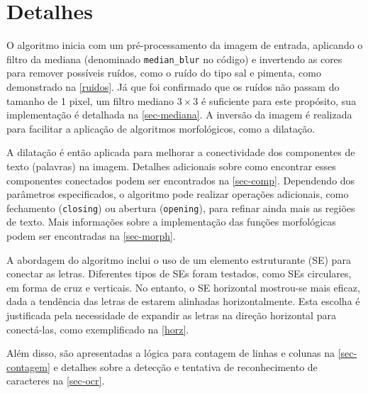 \documentclass[english, 
               brazil, 
               bsc] %
               {dcomp-abntex2}
\begin{document}






\section{Detalhes} 




O algoritmo inicia com um pré-processamento da imagem de entrada, aplicando o filtro da mediana (denominado \texttt{median\_blur} no código) e invertendo as cores para remover possíveis ruídos, como o ruído do tipo sal e pimenta, como demonstrado na \autoref{ruidos}. Já que foi confirmado que os ruídos não passam do tamanho de 1 pixel, um filtro mediano $3 \times 3$ é suficiente para este propósito, sua implementação é detalhada na \autoref{sec-mediana}. A inversão da imagem é realizada para facilitar a aplicação de algoritmos morfológicos, como a dilatação.


A dilatação é então aplicada para melhorar a conectividade dos componentes de texto (palavras) na imagem. Detalhes adicionais sobre como encontrar esses componentes conectados podem ser encontrados na \autoref{sec-comp}. Dependendo dos parâmetros especificados, o algoritmo pode realizar operações adicionais, como fechamento (\texttt{closing}) ou abertura (\texttt{opening}), para refinar ainda mais as regiões de texto. Mais informações sobre a implementação das funções morfológicas podem ser encontradas na \autoref{sec-morph}.


A abordagem do algoritmo inclui o uso de um elemento estruturante (SE) para conectar as letras. Diferentes tipos de SEs foram testados, como SEs circulares, em forma de cruz e verticais. No entanto, o SE horizontal mostrou-se mais eficaz, dada a tendência das letras de estarem alinhadas horizontalmente. Esta escolha é justificada pela necessidade de expandir as letras na direção horizontal para conectá-las, como exemplificado na \autoref{horz}.


Além disso, são apresentadas a lógica para contagem de linhas e colunas na \autoref{sec-contagem} e detalhes sobre a detecção e tentativa de reconhecimento de caracteres na \autoref{sec-ocr}.
\end{document}
